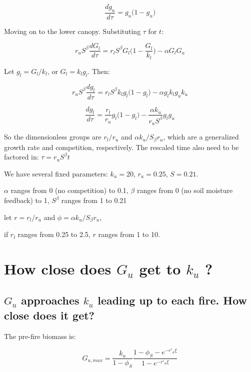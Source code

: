 \documentclass{article}
\begin{document}
\begin{equation*}
  \frac{d   g_u}{d\tau} =
	 g_u \bigg(1 -  g_u \bigg)
\end{equation*}

Moving on to the lower canopy.  Substituting $\tau$ for $t$:

\begin{equation*}
	 r_u S^\beta \frac{d G_l}{d \tau } = r_l S^\beta G_l \bigg(1-\frac{G_l}{k_l}\bigg) - \alpha G_l G_u
\end{equation*}

Let  $g_l = G_l/k_l$, or   $G_l =   k_l g_l$.  Then:

\begin{equation*}
r_u   S^\beta \frac{d g_l}{d \tau } = r_l S^\beta k_l g_l \big(1-g_l \big) - \alpha g_l k_l g_u k_u
\end{equation*}

\begin{equation*}
 \frac{d g_l}{d \tau } =\frac{ r_l}{r_u }  g_l \big(1-g_l \big) - \frac{\alpha k_u}{r_u  S^\beta}  g_l g_u
\end{equation*}

So the dimensionless groups are $r_l/r_u$ and $\alpha k_u / S_\beta r_u$, which are a generalized growth rate and competition, respectively.  The rescaled time also need to be factored in:  $\tau = r_u S^\beta t$


We have several fixed parameters:  $k_u = 20$, $r_u = 0.25$, $S=0.21$.

$\alpha$ ranges from 0 (no competition) to 0.1,
$\beta$ ranges from 0 (no soil moisture feedback) to 1, $S^\beta$ ranges from 1  to 0.21

let  $r = r_l/r_u$ and $\phi =  \alpha k_u / S_\beta r_u$,

if $r_l$ ranges from 0.25 to 2.5,  $r$ ranges from 1 to 10.



\section{How close does $G_u$ get to $k_u$ ?}
 \subsection{ $G_u$ approaches $k_u$  leading up to each fire. How close does it get?}

The  pre-fire biomass is:

\begin{equation}
  G_{u,max} =  \frac{k_u }{1-\phi_S}   \frac{1- \phi_S - e^{-r'_u \xi} }{1 - e^{-r'_u \xi}}
  \label{G_u_max}
\end{equation}
\end{document}
